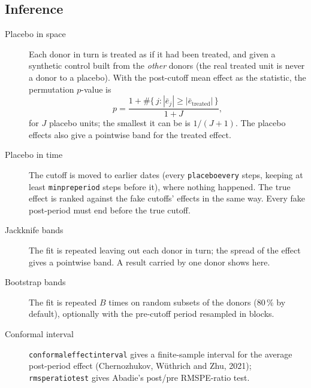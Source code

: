 \documentclass[11pt]{report}
\newcommand{\codeunderscore}{\textunderscore\allowbreak}
\newcommand{\code}[1]{\texttt{\let\_\codeunderscore #1}}
\begin{document}
\subsection{Inference}\label{sec:scminference}
\begin{description}
  \item[Placebo in space] Each donor in turn is treated as if it had been treated, and
        given a synthetic control built from the \emph{other} donors (the real treated
        unit is never a donor to a placebo). With the post-cutoff mean effect as the
        statistic, the permutation $p$-value is
        \begin{equation}
          p = \frac{1 + \#\{\,j : |\bar{e}_j| \ge |\bar{e}_\text{treated}|\,\}}{1 + J},
        \end{equation}
        for $J$ placebo units; the smallest it can be is $1/(J+1)$. The placebo effects
        also give a pointwise band for the treated effect.
  \item[Placebo in time] The cutoff is moved to earlier dates (every \code{placebo\_every}
        steps, keeping at least \code{min\_pre\_period} steps before it), where nothing
        happened. The true effect is ranked against the fake cutoffs' effects in the same
        way. Every fake post-period must end before the true cutoff.
  \item[Jackknife bands] The fit is repeated leaving out each donor in turn; the spread of
        the effect gives a pointwise band. A result carried by one donor shows here.
  \item[Bootstrap bands] The fit is repeated $B$ times on random subsets of the donors
        (80\,\% by default), optionally with the pre-cutoff period resampled in blocks.
  \item[Conformal interval] \code{conformal\_effect\_interval} gives a finite-sample
        interval for the average post-period effect (Chernozhukov, W\"uthrich and Zhu,
        2021); \code{rmspe\_ratio\_test} gives Abadie's post/pre RMSPE-ratio test.
\end{description}
\end{document}
